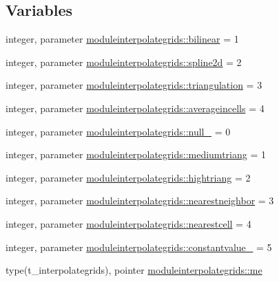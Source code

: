 \subsection*{Variables}
\begin{DoxyCompactItemize}
\item 
integer, parameter \mbox{\hyperlink{namespacemoduleinterpolategrids_ac8341ddae5bb639408912384ff746df5}{moduleinterpolategrids\+::bilinear}} = 1
\item 
integer, parameter \mbox{\hyperlink{namespacemoduleinterpolategrids_a681a3b341faceff9996c4dd9cb253955}{moduleinterpolategrids\+::spline2d}} = 2
\item 
integer, parameter \mbox{\hyperlink{namespacemoduleinterpolategrids_a54eaef7676acaf847ecb309033093046}{moduleinterpolategrids\+::triangulation}} = 3
\item 
integer, parameter \mbox{\hyperlink{namespacemoduleinterpolategrids_a9beae6792d58f611c7648e4e715951f8}{moduleinterpolategrids\+::averageincells}} = 4
\item 
integer, parameter \mbox{\hyperlink{namespacemoduleinterpolategrids_ac7780eea9b7811779df370a3ac901839}{moduleinterpolategrids\+::null\+\_\+}} = 0
\item 
integer, parameter \mbox{\hyperlink{namespacemoduleinterpolategrids_a9f3037cf7605db0775ef6c7ed80f3629}{moduleinterpolategrids\+::mediumtriang}} = 1
\item 
integer, parameter \mbox{\hyperlink{namespacemoduleinterpolategrids_adbfa0fd2fc99081cf59c07846b496309}{moduleinterpolategrids\+::hightriang}} = 2
\item 
integer, parameter \mbox{\hyperlink{namespacemoduleinterpolategrids_afa5b41783be14839941a78db8aaed8f8}{moduleinterpolategrids\+::nearestneighbor}} = 3
\item 
integer, parameter \mbox{\hyperlink{namespacemoduleinterpolategrids_a04cc7157f4bcb1187e20178dcbec08d6}{moduleinterpolategrids\+::nearestcell}} = 4
\item 
integer, parameter \mbox{\hyperlink{namespacemoduleinterpolategrids_aa6629e5e5c7722feeeb9bd4d9c195aff}{moduleinterpolategrids\+::constantvalue\+\_\+}} = 5
\item 
type(t\+\_\+interpolategrids), pointer \mbox{\hyperlink{namespacemoduleinterpolategrids_a4c871b123670d460c1cb96f90f4bf4d6}{moduleinterpolategrids\+::me}}
\end{DoxyCompactItemize}
